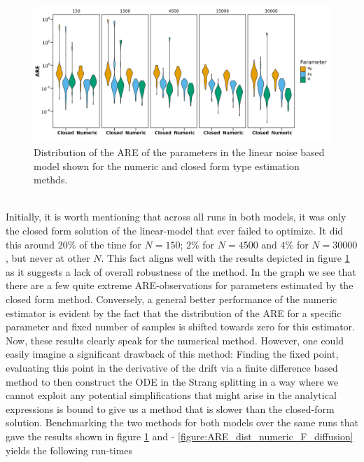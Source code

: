 \begin{figure}[h!]
\begin{center}
    \includegraphics[scale = .1]{figures/ARE_dist_result_plot_Linear.jpeg}
    \caption{Distribution of the ARE of the parameters in the linear noise based model shown for the numeric and closed form type estimation methds.}
    \label{figure:ARE_dist_linear_noise}
\end{center}
\end{figure}\\
Initially, it is worth mentioning that across all runs in both models, it was only the closed form solution of the linear-model that ever failed to optimize. It did this around $20\%$ of the time for $N = 150$; $2\%$ for $N = 4500$ and $4\%$ for $N = 30000$, but never at other $N$. This fact aligns well with the results depicted in figure \ref{figure:ARE_dist_linear_noise} as it suggests a lack of overall robustness of the method. In the graph we see that there are a few quite extreme ARE-observations for parameters estimated by the closed form method. Conversely, a general better performance of the numeric estimator is evident by the fact that the distribution of the ARE for a specific parameter and fixed number of samples is shifted towards zero for this estimator. Now, these results clearly speak for the numerical method. However, one could easily imagine a significant drawback of this method: Finding the fixed point, evaluating this point in the derivative of the drift via a finite difference based method to then construct the ODE in the Strang splitting in a way where we cannot exploit any potential simplifications that might arise in the analytical expressions is bound to give us a method that is slower than the closed-form solution. Benchmarking the two methods for both models over the same runs that gave the results shown in figure \ref{figure:ARE_dist_linear_noise} and - \ref{figure:ARE_dist_numeric_F_diffusion} yields the following run-times
